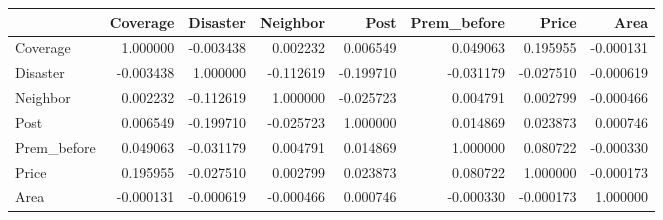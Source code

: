 \begin{tabular}{lrrrrrrr}
\toprule
 & Coverage & Disaster & Neighbor & Post & Prem\_before & Price & Area \\
\midrule
Coverage & 1.000000 & -0.003438 & 0.002232 & 0.006549 & 0.049063 & 0.195955 & -0.000131 \\
Disaster & -0.003438 & 1.000000 & -0.112619 & -0.199710 & -0.031179 & -0.027510 & -0.000619 \\
Neighbor & 0.002232 & -0.112619 & 1.000000 & -0.025723 & 0.004791 & 0.002799 & -0.000466 \\
Post & 0.006549 & -0.199710 & -0.025723 & 1.000000 & 0.014869 & 0.023873 & 0.000746 \\
Prem\_before & 0.049063 & -0.031179 & 0.004791 & 0.014869 & 1.000000 & 0.080722 & -0.000330 \\
Price & 0.195955 & -0.027510 & 0.002799 & 0.023873 & 0.080722 & 1.000000 & -0.000173 \\
Area & -0.000131 & -0.000619 & -0.000466 & 0.000746 & -0.000330 & -0.000173 & 1.000000 \\
\bottomrule
\end{tabular}

